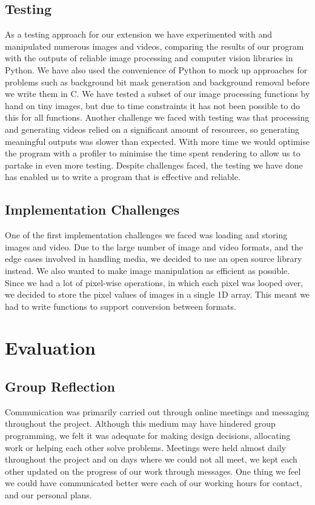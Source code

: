 \documentclass[11pt]{article}
\begin{document}
  \subsection*{Testing}
As a testing approach for our extension we have experimented with and manipulated numerous images and videos, comparing the results of our program with the outputs of reliable image processing and computer vision libraries in Python. We have also used the convenience of Python to mock up approaches for problems such as background bit mask generation and background removal before we write them in C. We have tested a subset of our image processing functions by hand on tiny images, but due to time constraints it has not been possible to do this for all functions. Another challenge we faced with testing was that processing and generating videos relied on a significant amount of resources, so generating meaningful outputs was slower than expected. With more time we would optimise the program with a profiler to minimise the time spent rendering to allow us to partake in even more testing.  Despite challenges faced, the testing we have done has enabled us to write a program that is effective and reliable.

  \subsection*{Implementation Challenges}
  One of the first implementation challenges we faced was loading and storing images and video. Due to the large number of image and video formats, and the edge cases involved in handling media, we decided to use an open source library instead. We also wanted to make image manipulation as efficient as possible. Since we had a lot of pixel-wise operations, in which each pixel was looped over, we decided to store the pixel values of images in a single 1D array. This meant we had to write functions to support conversion between formats.

  \section*{Evaluation}

  \subsection*{Group Reflection}

Communication was primarily carried out through online meetings and messaging throughout the project. Although this medium may have hindered group programming, we felt it was adequate for making design decisions, allocating work or helping each other solve problems. Meetings were held almost daily throughout the project and on days where we could not all meet, we kept each other updated on the progress of our work through messages. One thing we feel we could have communicated better were each of our working hours for contact, and our personal plans. 
\end{document}
